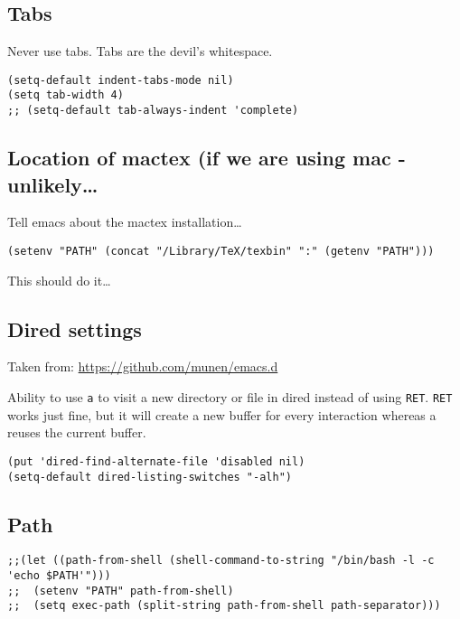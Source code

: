 \documentclass[12pt]{article}
\begin{document}
\subsection{Tabs}
\label{sec:org09bc98e}
Never use tabs. Tabs are the devil’s whitespace.

\begin{verbatim}
(setq-default indent-tabs-mode nil)
(setq tab-width 4)
;; (setq-default tab-always-indent 'complete)
\end{verbatim}

\subsection{Location of mactex (if we are using mac - unlikely\ldots{}}
\label{sec:org98c1ef9}
Tell emacs about the mactex installation\ldots{}

\begin{verbatim}
(setenv "PATH" (concat "/Library/TeX/texbin" ":" (getenv "PATH")))
\end{verbatim}

This should do it\ldots{}

\subsection{Dired settings}
\label{sec:org206337f}

Taken from: \url{https://github.com/munen/emacs.d}


Ability to use \texttt{a} to visit a new directory or file in dired instead of using \texttt{RET}.
\texttt{RET} works just fine, but it will create a new buffer for every interaction
whereas a reuses the current buffer.

\begin{verbatim}
(put 'dired-find-alternate-file 'disabled nil)
(setq-default dired-listing-switches "-alh")
\end{verbatim}

\subsection{Path}
\label{sec:orga8624a4}

\begin{verbatim}
;;(let ((path-from-shell (shell-command-to-string "/bin/bash -l -c 'echo $PATH'")))
;;  (setenv "PATH" path-from-shell)
;;  (setq exec-path (split-string path-from-shell path-separator)))

\end{verbatim}
\end{document}
